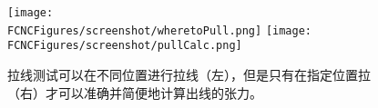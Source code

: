 \begin{figure}[H]
\centering
\texttt{[image: \\FCNCFigures/screenshot/wheretoPull.png]}
\texttt{[image: \\FCNCFigures/screenshot/pullCalc.png]}
\caption{拉线测试可以在不同位置进行拉线（左），但是只有在指定位置拉（右）才可以准确并简便地计算出线的张力。}
\label{fig:wheretoPull}
\end{figure}